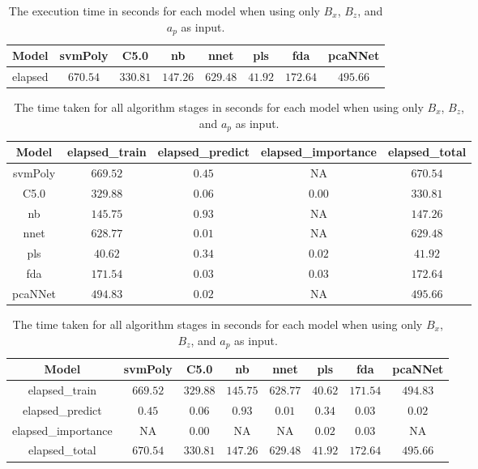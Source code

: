 \begin{table}[!ht]
	\centering
	\begin{tabular}{|c|c|c|c|c|c|c|c|}
		\hline
		Model & svmPoly & C5.0 & nb & nnet & pls & fda & pcaNNet \\ \hline
		elapsed & $670.54$ & $330.81$ & $147.26$ & $629.48$ & $41.92$ & $172.64$ & $495.66$ \\ \hline
	\end{tabular}
	\caption{The execution time in seconds for each model when using only $B_{x}$, $B_{z}$, and $a_{p}$ as input.}
	\label{tab:time:reverse:xzap:total}
\end{table}

\begin{table}[!ht]
	\centering
	\begin{tabular}{|c|c|c|c|c|}
		\hline
		Model & elapsed_train & elapsed_predict & elapsed_importance & elapsed_total \\ \hline
		svmPoly & $669.52$ & $0.45$ & NA & $670.54$ \\ \hline
		C5.0 & $329.88$ & $0.06$ & $0.00$ & $330.81$ \\ \hline
		nb & $145.75$ & $0.93$ & NA & $147.26$ \\ \hline
		nnet & $628.77$ & $0.01$ & NA & $629.48$ \\ \hline
		pls & $40.62$ & $0.34$ & $0.02$ & $41.92$ \\ \hline
		fda & $171.54$ & $0.03$ & $0.03$ & $172.64$ \\ \hline
		pcaNNet & $494.83$ & $0.02$ & NA & $495.66$ \\ \hline
	\end{tabular}
	\caption{The time taken for all algorithm stages in seconds for each model when using only $B_{x}$, $B_{z}$, and $a_{p}$ as input.}
	\label{tab:time:xzap}
\end{table}

\begin{table}[!ht]
	\centering
	\begin{tabular}{|c|c|c|c|c|c|c|c|}
		\hline
		Model & svmPoly & C5.0 & nb & nnet & pls & fda & pcaNNet \\ \hline
		elapsed_train & $669.52$ & $329.88$ & $145.75$ & $628.77$ & $40.62$ & $171.54$ & $494.83$ \\ \hline
		elapsed_predict & $0.45$ & $0.06$ & $0.93$ & $0.01$ & $0.34$ & $0.03$ & $0.02$ \\ \hline
		elapsed_importance & NA & $0.00$ & NA & NA & $0.02$ & $0.03$ & NA \\ \hline
		elapsed_total & $670.54$ & $330.81$ & $147.26$ & $629.48$ & $41.92$ & $172.64$ & $495.66$ \\ \hline
	\end{tabular}
	\caption{The time taken for all algorithm stages in seconds for each model when using only $B_{x}$, $B_{z}$, and $a_{p}$ as input.}
	\label{tab:time:reverse:xzap}
\end{table}

